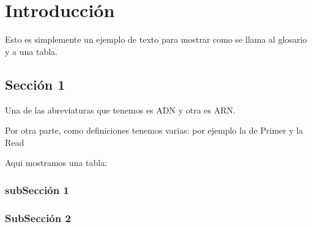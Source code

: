 
\chapter{Introducción} \label{Intro}
 

Esto es simplemente un ejemplo de texto para mostrar como se llama al glosario y a una tabla. 

\section{Sección 1}
Una de las abreviaturas que tenemos es \gls{ADN} y otra es \gls{ARN}.

Por otra parte, como definiciones tenemos varias: por ejemplo la de \gls{Primer} y la \gls{Read}

Aqui mostramos una tabla:



\subsection{subSección 1}
\lipsum[1-2] %

\subsection{SubSección 2}
\lipsum[1-2] %


